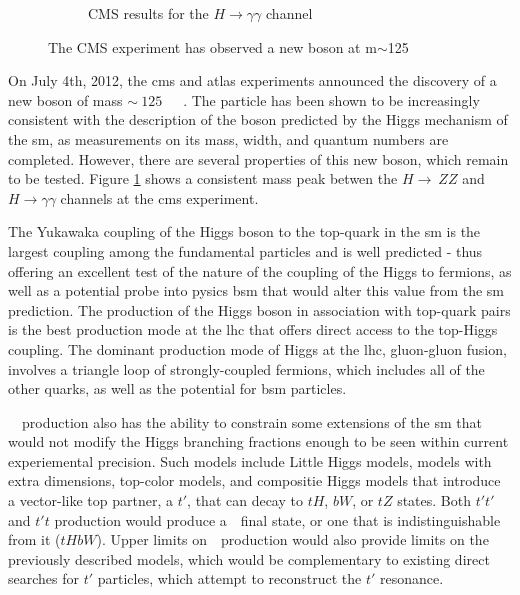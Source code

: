 \begin{figure}
\begin{subfigure}[b]{0.3\textwidth}
          \caption{CMS results for the $H\rightarrow\gamma\gamma$ channel}
      \end{subfigure}
      \caption{The CMS experiment has observed a new boson at m$\sim$125\GeVcc} \label{fig:cms_hZZ_hgg_results}
\end{figure}

\par On July 4th, 2012, the \acrfull{cms} and \acrfull{atlas} experiments announced the discovery of a new boson of mass $\sim~125$~\GeVcc~\cite{CMS:2012discovery}~\cite{ATLAS:2012discovery}.  The particle has been shown to be increasingly consistent with the description of the boson predicted by the Higgs mechanism of the \acrshort{sm}, as measurements on its mass, width, and quantum numbers are completed.  However, there are several properties of this new boson, which remain to be tested.  Figure \ref{fig:cms_hZZ_hgg_results} shows a consistent mass peak betwen the $H\rightarrow~ZZ$ and $H\rightarrow\gamma\gamma$ channels at the \acrshort{cms} experiment.  

\par The Yukawaka coupling of the Higgs boson to the top-quark in the \acrshort{sm} is the largest coupling among the fundamental particles and is well 
predicted - thus offering an excellent test of the nature of the coupling of the Higgs to fermions, as well as a potential probe into pysics \acrfull{bsm} that would alter this value from the \acrshort{sm} prediction.  The production of the Higgs boson in association with top-quark pairs is the best production mode at the \acrshort{lhc} that offers direct access to the top-Higgs coupling.  The dominant production mode of Higgs at the \acrshort{lhc}, gluon-gluon fusion, involves a triangle loop of strongly-coupled fermions, which includes all of the other quarks, as well as the potential for \acrshort{bsm} particles.  

\par ~\ttH~production also has the ability to constrain some extensions of the \acrshort{sm} that would not modify the Higgs branching fractions enough to be seen 
within current experiemental precision.  Such models include Little Higgs models, models with extra dimensions, top-color models, and compositie Higgs models that introduce a vector-like top partner, a $t'$, that can decay to $tH$, $bW$, or $tZ$ states.  Both $t't'$ and $t't$ production would produce a~\ttH~final state, or one that is indistinguishable from it ($tHbW$).  Upper limits on~\ttH~production would also provide limits on the previously described models, which would be complementary to existing direct searches for $t'$ particles, which attempt to reconstruct the $t'$ resonance.  

